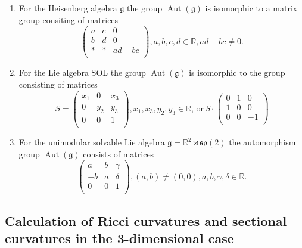 \documentclass[12pt]{article}
\begin{document}
\begin{enumerate}
\item For the Heisenberg algebra $\mathfrak{g}$ the group $\operatorname{Aut}(\mathfrak{g})$ is isomorphic to a matrix group
consiting of matrices
$$
\begin{pmatrix}
a & c & 0\\
b & d & 0\\
* & * & ad-bc\\
\end{pmatrix}, a,b,c,d\in\mathbb{R},ad-bc\not=0.
$$
\item For the Lie algebra SOL the group $\operatorname{Aut}(\mathfrak{g})$ is isomorphic to the group consisting of matrices
$$
S=\begin{pmatrix}
x_1 & 0 & x_3\\
0 &  y_2 & y_3\\
0 & 0 & 1\\
\end{pmatrix}, x_1,x_3,y_2,y_3\in\mathbb{R},\,\text{or}\, 
S\cdot
\begin{pmatrix}
0 & 1 & 0\\
1 & 0 & 0\\
0 & 0 & -1\\
\end{pmatrix}
$$
\item For the unimodular solvable Lie algebra $\mathfrak{g}=\mathbb{R}^2\rtimes\mathfrak{so}(2)$ the automorphism group $\operatorname{Aut}(\mathfrak{g})$ consists of matrices
$$
\begin{pmatrix}
a & b & \gamma\\
-b & a & \delta\\
0 & 0 & 1\\
\end{pmatrix}, (a,b)\not=(0,0), a,b, \gamma,\delta\in\mathbb{R}.
$$
\end{enumerate}
  
\subsection{Calculation of Ricci curvatures and sectional curvatures in the 3-dimensional case}
\end{document}
